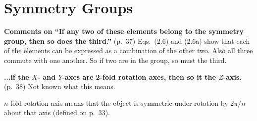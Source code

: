 \chapter{Symmetry Groups}

{\bf Comments on ``If any two of these elements belong to the symmetry
  group, then so does the third.''} (p.\ 37) Eqs.\ (2.6) and (2.6a)
show that each of the elements can be expressed as a combination of
the other two. Also all three commute with one another. So if two are
in the group, so must the third.


{\bf ...if the $X$- and $Y$-axes are 2-fold rotation axes, then so it
  the $Z$-axis.} (p.\ 38) Not known what this means.

$n$-fold rotation axis means that the object is symmetric under
rotation by $2\pi/n$ about that axis (defined on p.\ 33).

